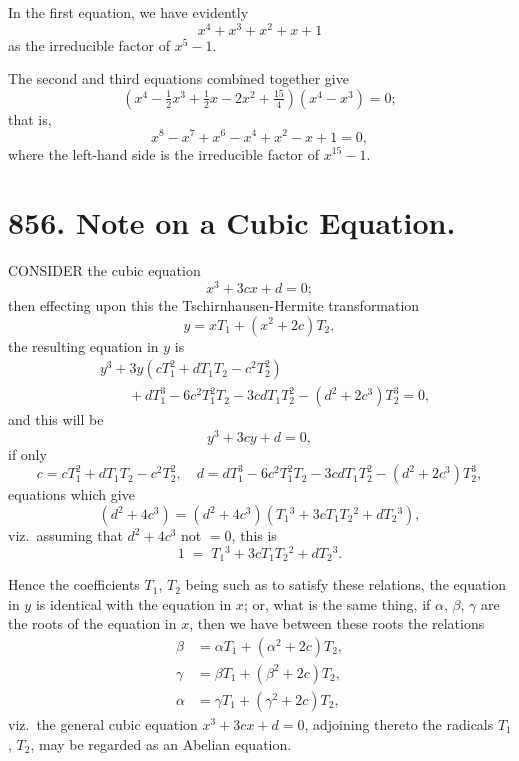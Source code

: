 \documentclass[11pt]{article}
\begin{document}
\medskip

In the first equation, we have evidently
\[
x^4 + x^3 + x^2 + x + 1
\]
as the irreducible factor of $x^5 - 1$.

The second and third equations combined together give
\[
\left(x^4 - \tfrac{1}{2}x^3 + \tfrac{1}{2}x - 2x^2 + \tfrac{15}{4}\right)\!\left(x^4 - x^3\right) = 0;
\]
that is,
\[
x^8 - x^7 + x^6 - x^4 + x^2 - x + 1 = 0,
\]
where the left-hand side is the irreducible factor of $x^{15} - 1$.

\vfill

\newpage

\section*{856. Note on a Cubic Equation.}


\medskip

\noindent CONSIDER the cubic equation
\[
x^3 + 3cx + d = 0;
\]
then effecting upon this the Tschirnhausen-Hermite transformation
\[
y = xT_1 + (x^2 + 2c)T_2,
\]
the resulting equation in $y$ is
\begin{align*}
& y^3 + 3y(cT_1^2 + dT_1T_2 - c^2T_2^2)\\
& \qquad + dT_1^3 - 6c^2T_1^2 T_2 - 3cdT_1T_2^2 - (d^2 + 2c^3)T_2^3 = 0,
\end{align*}
and this will be
\[
y^3 + 3cy + d = 0,
\]
if only
\[
c = cT_1^2 + dT_1 T_2 - c^2 T_2^2,\quad d = dT_1^3 - 6c^2 T_1^2 T_2 - 3cdT_1 T_2^2 - (d^2 + 2c^3)T_2^3,
\]
equations which give
\[
(d^2 + 4c^3) = (d^2 + 4c^3)(T_1{}^3 + 3cT_1 T_2{}^2 + dT_2{}^3),
\]
viz.\ assuming that $d^2 + 4c^3$ not $=0$, this is
\[
1 \;=\; T_1{}^3 + 3cT_1 T_2{}^2 + dT_2{}^3.
\]

Hence the coefficients $T_1$, $T_2$ being such as to satisfy these relations, the equation in $y$ is identical with the equation in $x$; or, what is the same thing, if $\alpha$, $\beta$, $\gamma$ are the roots of the equation in $x$, then we have between these roots the relations
\begin{align*}
\beta &= \alpha T_1 + (\alpha^2 + 2c) T_2,\\
\gamma &= \beta T_1 + (\beta^2 + 2c) T_2,\\
\alpha &= \gamma T_1 + (\gamma^2 + 2c) T_2,
\end{align*}
viz.\ the general cubic equation $x^3 + 3cx + d = 0$, adjoining thereto the radicals $T_1$, $T_2$, may be regarded as an Abelian equation.
\end{document}
